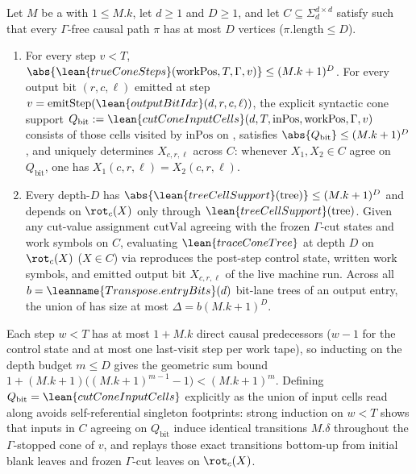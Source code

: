 \begin{lemma}\label{lem:tm-cut-cone}
Let $M$ be a  with $1 \le M.k$, let $d \ge 1$ and $D \ge 1$, and let
$C \subseteq \Sigma_d^{d\times d}$ satisfy  such that every $\Gamma$-free
causal path $\pi$ has at most $D$ vertices ($\pi.\mathrm{length} \le D$).
\begin{enumerate}[label=(\alph*)]
\item For every step $v < T$, $\abs{\lean{trueConeSteps}(\mathrm{workPos}, T, \Gamma, v)} \le
  (M.k + 1)^D$. For every output bit $(r, c, \ell)$ emitted at step
  $v = \mathrm{emitStep}(\lean{outputBitIdx}(d, r, c, \ell))$, the explicit syntactic cone support
  $Q_{\mathrm{bit}} := \lean{cutConeInputCells}(d, T, \mathrm{inPos}, \mathrm{workPos}, \Gamma, v)$
  consists of those cells visited by $\mathrm{inPos}$ on , satisfies
  $\abs{Q_{\mathrm{bit}}} \le (M.k + 1)^D$, and uniquely determines $X_{c,r,\ell}$ across $C$:
  whenever $X_1, X_2 \in C$ agree on $Q_{\mathrm{bit}}$, one has $X_1(c,r,\ell) = X_2(c,r,\ell)$.
\item Every depth-$D$  has $\abs{\lean{treeCellSupport}(\mathrm{tree})} \le
  (M.k + 1)^D$ and depends on $\rot_c(X)$ only through $\lean{treeCellSupport}(\mathrm{tree})$. Given
  any cut-value assignment $\mathrm{cutVal}$ agreeing with the frozen $\Gamma$-cut states and work
  symbols on $C$, evaluating $\lean{traceConeTree}$ at depth $D$ on $\rot_c(X)$ ($X \in C$) via
   reproduces the post-step control state, written work symbols, and emitted output
  bit $X_{c,r,\ell}$ of the live machine run. Across all $b = \leanname{Transpose.entryBits}(d)$
  bit-lane trees of an output entry, the union of  has size at most
  $\Delta = b(M.k + 1)^D$.
\end{enumerate}
\end{lemma}
\begin{outline}
Each step $w < T$ has at most $1 + M.k$ direct causal predecessors ($w - 1$ for the control state and
at most one last-visit step per work tape), so inducting on the depth budget $m \le D$ gives the
geometric sum bound $1 + (M.k+1)\bigl((M.k+1)^{m-1} - 1\bigr) < (M.k+1)^m$. Defining
$Q_{\mathrm{bit}} = \lean{cutConeInputCells}$ explicitly as the union of input cells read along
 avoids self-referential singleton footprints: strong induction on $w < T$ shows
that inputs in $C$ agreeing on $Q_{\mathrm{bit}}$ induce identical transitions $M.\delta$ throughout
the $\Gamma$-stopped cone of $v$, and  replays those exact transitions bottom-up
from initial blank leaves and frozen $\Gamma$-cut leaves on $\rot_c(X)$.
\end{outline}

